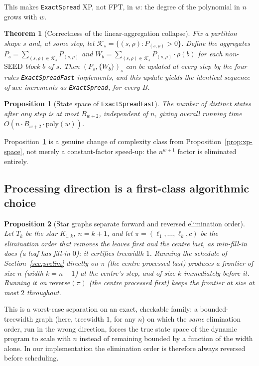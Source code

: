 \documentclass[11pt]{article}
\newtheorem{theorem}{Theorem}
\newtheorem{proposition}{Proposition}
\theoremstyle{definition}
\theoremstyle{remark}
\begin{document}
This makes \texttt{ExactSpread} XP, not FPT, in $w$: the degree of the
polynomial in $n$ grows with $w$.

\begin{theorem}[Correctness of the linear-aggregation collapse]\label{thm:twig-collapse}
Fix a partition shape $s$ and, at some step, let
$\mathcal K_s=\{(s,\rho):P_{(s,\rho)}>0\}$. Define the aggregates
$P_s=\sum_{(s,\rho)\in\mathcal K_s}P_{(s,\rho)}$ and
$W_b=\sum_{(s,\rho)\in\mathcal K_s}P_{(s,\rho)}\cdot\rho(b)$ for each
non-$\mathrm{SEED}$ block $b$ of $s$. Then $(P_s,\{W_b\})_s$ can be updated
at every step by the four rules \texttt{ExactSpreadFast} implements, and
this update yields the identical sequence of $\mathrm{acc}$ increments as
\texttt{ExactSpread}, for every $B$.
\end{theorem}

\begin{proposition}[State space of \texttt{ExactSpreadFast}]\label{prop:fpt-space}
The number of distinct states after any step is at most $B_{w+2}$, independent
of $n$, giving overall running time $O(n\cdot B_{w+2}\cdot\mathrm{poly}(w))$.
\end{proposition}

Proposition~\ref{prop:fpt-space} is a genuine change of complexity class
from Proposition~\ref{prop:xp-space}, not merely a constant-factor speed-up:
the $n^{w+1}$ factor is eliminated entirely.

\subsection{Processing direction is a first-class algorithmic choice}\label{sec:twig-direction}

\begin{proposition}[Star graphs separate forward and reversed elimination order]\label{prop:direction}
Let $T_k$ be the star $K_{1,k}$, $n=k+1$, and let
$\pi=(\ell_1,\dots,\ell_k,c)$ be the elimination order that removes the
leaves first and the centre last, as min-fill-in does (a leaf has fill-in $0$); it certifies
treewidth $1$. Running the schedule of Section~\ref{sec:prelim} directly on
$\pi$ (the centre processed last) produces a frontier of size $n$ (width $k=n-1$) at the centre's step,
and of size $k$ immediately before it. Running it on $\mathrm{reverse}(\pi)$
(the centre processed first) keeps the frontier at size at most $2$
throughout.
\end{proposition}

This is a worst-case separation on an exact, checkable family: a
bounded-treewidth graph (here, treewidth $1$, for any $n$) on which the
\emph{same} elimination order, run in the wrong direction, forces the true
state space of the dynamic program to scale with $n$ instead of remaining
bounded by a function of the width alone. In our implementation the
elimination order is therefore always reversed before scheduling.
\end{document}
